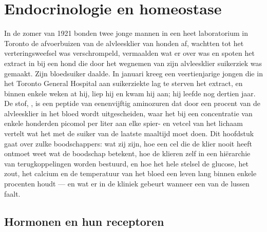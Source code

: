 \chapter{Endocrinologie en homeostase}\label{ch:b3:endocrinology}

In de zomer van 1921 bonden twee jonge mannen in een heet laboratorium
in Toronto de afvoerbuizen van de alvleesklier van honden af, wachtten
tot het verteringsweefsel was verschrompeld, vermaalden wat er over was
en spoten het extract in bij een hond die door het wegnemen van zijn
alvleesklier suikerziek was gemaakt. Zijn bloedsuiker daalde. In
januari kreeg een veertienjarige jongen die in het Toronto General
Hospital aan suikerziekte lag te sterven het extract, en binnen enkele
weken at hij, liep hij en kwam hij aan; hij leefde nog dertien jaar. De
stof, , is een peptide van eenenvijftig aminozuren dat door een
procent van de alvleesklier in het bloed wordt uitgescheiden, waar het
bij een concentratie van enkele honderden picomol per liter aan elke
spier- en vetcel van het lichaam vertelt wat het met de suiker van de
laatste maaltijd moet doen. Dit hoofdstuk gaat over zulke
boodschappers: wat zij zijn, hoe een cel die de klier nooit heeft
ontmoet weet wat de boodschap betekent, hoe de klieren zelf in een
hiërarchie van terugkoppelingen worden bestuurd, en hoe het hele
stelsel de glucose, het zout, het calcium en de temperatuur van het
bloed een leven lang binnen enkele procenten houdt --- en wat er in de
kliniek gebeurt wanneer een van de lussen faalt.

\section{Hormonen en hun receptoren}

